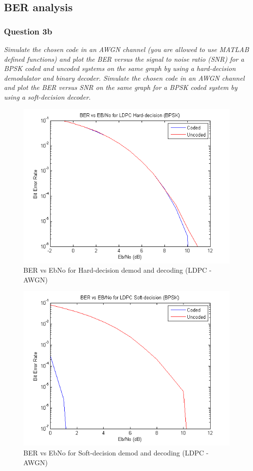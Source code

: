 \documentclass[a4paper]{article}
\begin{document}
\subsection{BER analysis}

\subsubsection{Question 3b} \textit{Simulate the chosen code in an AWGN channel (you are allowed to use MATLAB defined functions) and plot the BER versus the signal to noise ratio (SNR) for a BPSK coded and uncoded systems on the same graph by using a hard-decision demodulator and binary decoder. Simulate the chosen code in an AWGN channel and plot the BER versus SNR on the same graph for a BPSK coded system by using a soft-decision decoder.}

\begin{figure}[H]
\centering
\includegraphics[scale=0.5]{plots/ber_vs_ebno_ldpc_awgn_hard.png}
\caption{BER vs EbNo for Hard-decision demod and decoding (LDPC - AWGN)}
\end{figure}

\begin{figure}[H]
\centering
\includegraphics[scale=0.5]{plots/ber_vs_ebno_ldpc_awgn_soft.png}
\caption{BER vs EbNo for Soft-decision demod and decoding (LDPC - AWGN)}
\end{figure}
\end{document}
